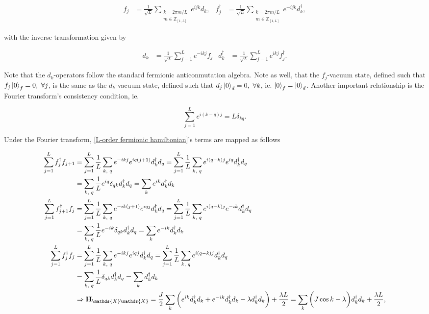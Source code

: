 \documentclass{homework}
\begin{document}
\begin{align}
    f_j &= \frac{1}{\sqrt{L}} \sum_{\substack{k = {2\pi m/L}\\
    m \in \mathds{Z}_{[1, L]} }}
                  e^{ijk} d_k, & f_j^{\dagger} &=\frac{1}{\sqrt{L}}  \sum_{\substack{k = {2\pi m/L}\\
    m \in \mathds{Z}_{[1, L]}}} e^{-ijk} d_k^{\dagger},
\end{align}

with the inverse transformation given by 

\begin{align}
    d_k &= \frac{1}{\sqrt{L}} \sum_{j=1}^{L}
                  e^{-ikj} f_j &  d_k^{\dagger} &= \frac{1}{\sqrt{L}} \sum_{j=1}^{L}
                  e^{ikj} f_j^{\dagger}.
\end{align}

Note that the $d_k$-operators follow the standard fermionic anticonmutation algebra. Note as well, that the $f_j$-vacuum state, defined such that $f_j \ket{0}_f = 0, \textnormal{ } \forall j$, is the same as the $d_k$-vacuum state, defined such that $d_j \ket{0}_d = 0, \textnormal{ } \forall k$, ie. $\ket{0}_f = \ket{0}_d$. Another important relationship is the Fourier transform's consistency condition, ie. 

$$
\sum_{j=1}^{L} e^{i(k-q)j} = L \delta_{kq}.
$$

Under the Fourier transform, \eqref{L-order fermionic hamiltonian}'s terms are mapped as follows 

\begin{align*} 
    \sum_{j=1}^{L} f_j^\dagger f_{j+1} &= \sum_{j=1}^{L} \frac{1}{L} \sum_{k, \blanky q} e^{-ikj} e^{iq(j+1)} d_k^\dagger d_q = \sum_{j=1}^{L} \frac{1}{L} \sum_{k, \blanky q} e^{i(q-k)j} e^{iq} d_k^\dagger d_q \\
    &= \sum_{k, \blanky q} \frac{1}{L} e^{iq} \delta_{qk} d_k^\dagger d_q = \sum_{k} e^{ik} d_k^\dagger d_k \\
    \sum_{j=1}^{L} f_{j+1}^\dagger f_{j} &=  \sum_{j=1}^{L} \frac{1}{L} \sum_{k, \blanky q} e^{-ik(j+1)} e^{iqj} d_k^\dagger d_q = \sum_{j=1}^{L} \frac{1}{L} \sum_{k, \blanky q} e^{i(q-k)j} e^{-ik} d_k^\dagger d_q \\
    &= \sum_{k, \blanky q} \frac{1}{L} e^{-ik} \delta_{qk} d_k^\dagger d_q = \sum_{k} e^{-ik} d_k^\dagger d_k \\
    \sum_{j=1}^{L} f_{j}^\dagger f_{j} &=  \sum_{j=1}^{L} \frac{1}{L} \sum_{k, \blanky q} e^{-ikj} e^{iqj} d_k^\dagger d_q = \sum_{j=1}^{L} \frac{1}{L} \sum_{k, \blanky q} e^{i(q-k)j}  d_k^\dagger d_q \\
    &= \sum_{k, \blanky q} \frac{1}{L} \delta_{qk} d_k^\dagger d_q = \sum_{k} d_k^\dagger d_k \\ &\Rightarrow 
    {\bf H}_{\mathds{X}\mathds{X}} = \frac{J}{2} \sum_{k} \bigg(e^{ik} d_{k}^{\dagger} d_{k} + e^{-ik} d_{k}^{\dagger} d_k - \lambda d_{k}^{\dagger} d_{k}\bigg) + \frac{\lambda L}{2} = \sum_{k} \bigg(J \cos k - \lambda \bigg)d_{k}^{\dagger} d_{k} + \frac{\lambda L}{2},
\end{align*} 
\end{document}
